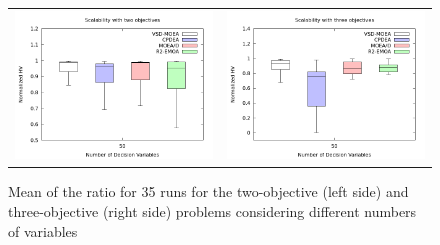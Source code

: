 \begin{figure}[h]
\centering
\begin{tabular}{c c}
\includegraphics[scale=0.28]{Images/scalability_2obj_2x107.png} & \includegraphics[scale=0.28]{Images/scalability_3obj_2x107.png}
\end{tabular}
\caption{Mean of the \HV{} ratio for 35 runs for the two-objective (left side) and three-objective (right side) problems considering different numbers of variables}\label{fig:variable-decision-scalability}
\end{figure}

